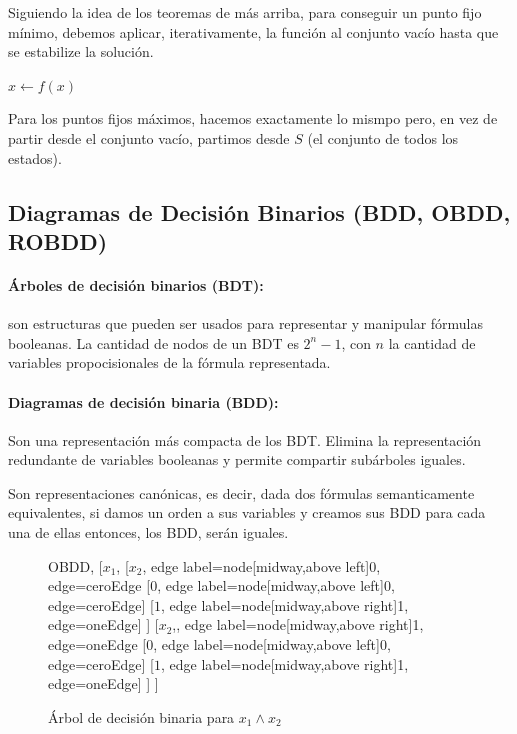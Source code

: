 Siguiendo la idea de los teoremas de más arriba, para conseguir un punto fijo mínimo, debemos aplicar, iterativamente, la función al conjunto vacío hasta que se estabilize la solución.
\begin{algorithmic}
    \State $x \leftarrow f(x)$
\EndWhile
\end{algorithmic}
Para los puntos fijos máximos, hacemos exactamente lo mismpo pero, en vez de partir desde el conjunto vacío, partimos desde $S$ (el conjunto de todos los estados).

\subsection{Diagramas de Decisión Binarios (BDD, OBDD, ROBDD)}

\paragraph{Árboles de decisión binarios (BDT):} son estructuras que pueden ser usados para representar y manipular fórmulas booleanas. La cantidad de nodos de un BDT es $2^n-1$, con $n$ la cantidad de variables propocisionales de la fórmula representada.

\paragraph{Diagramas de decisión binaria (BDD):} Son una representación más compacta de los BDT. Elimina la representación redundante de variables booleanas y permite compartir subárboles iguales.

Son representaciones canónicas, es decir, dada dos fórmulas semanticamente equivalentes, si damos un orden a sus variables y creamos sus BDD para cada una de ellas entonces, los BDD, serán iguales.

\begin{figure}[h]
\centering
		\begin{forest} OBDD,
			[$x_1$,
				[$x_2$, edge label={node[midway,above left]{0}}, edge=ceroEdge
					[$0$, edge label={node[midway,above left]{0}}, edge=ceroEdge]
					[$1$, edge label={node[midway,above right]{1}}, edge=oneEdge]
				]
				[$x_2$,, edge label={node[midway,above right]{1}}, edge=oneEdge
								[$0$, edge label={node[midway,above left]{0}}, edge=ceroEdge]
								[$1$, edge label={node[midway,above right]{1}}, edge=oneEdge]
							]
			]
		\end{forest}
	\caption{Árbol de decisión binaria para $x_1 \land x_2$}
\end{figure}

